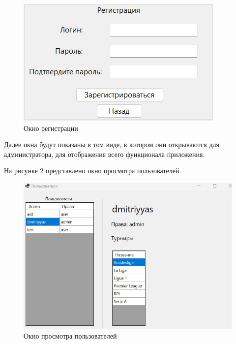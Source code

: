 \begin{figure}
  \centering
  \includegraphics[scale=0.5]{inc/register.jpg}
  \caption{Окно регистрации}
  \label{img:reg}
\end{figure}
Далее окна будут показаны в том виде, в котором они открываются для администратора, для отображения всего функционала приложения.

На рисунке \ref{img:users} представлено окно просмотра пользователей.
\begin{figure}
  \centering
  \includegraphics[scale=0.5]{inc/users.jpg}
  \caption{Окно просмотра пользователей}
  \label{img:users}
\end{figure}

